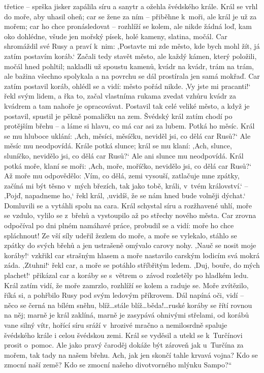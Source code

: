 třetice -- sprška jisker zapálila síru a sanytr a ožehla švédského krále. Král se vrhl do moře, aby uhasil oheň; car se žene za ním -- přiběhne k moři, ale král je už za mořem; car ho chce pronásledovat -- rozhlíží se kolem, ale nikde žádná loď, kam oko dohlédne, všude jen mořský písek, holé kameny, slatina, močál. Car shromáždil své Rusy a praví k nim: ‚Postavte mi zde město, kde bych mohl žít, já zatím postavím koráb.‘ Začali tedy stavět město, ale každý kámen, který položili, močál hned pohltil; nakladli už spoustu kamenů, kvádr na kvádr, trám na trám, ale bažina všechno spolykala a na povrchu se dál prostírala jen samá mokřaď. Car zatím postavil koráb, ohlédl se a vidí: město pořád nikde. ‚Vy jste mi pracanti!‘ řekl svým lidem, a řka to, začal vlastníma rukama zvedat vzhůru kvádr za kvádrem a tam nahoře je opracovávat. Postavil tak celé veliké město, a když je postavil, spustil je pěkně pomaličku na zem. Švédský král zatím chodí po protějším břehu -- a láme si hlavu, co má car asi za lubem. Potká ho měsíc. Král se mu hluboce uklání: ‚Ach, měsíci, měsíčku, neviděl jsi, co dělá car Rusů?‘ Ale měsíc mu neodpovídá. Krále potká slunce; král se mu klaní: ‚Ach, slunce, sluníčko, nevidělo jsi, co dělá car Rusů?‘ Ale ani slunce mu neodpovídá. Král potká moře, klaní se moři: ‚Ach, moře, moříčko, nevidělo jsi, co dělá car Rusů?‘ Až moře mu odpovědělo: ‚Vím, co dělá, zemi vysouší, zatlačuje mne zpátky, začíná mi být těsno v mých březích, tak jako tobě, králi, v tvém království.‘ -- ‚Pojď, napadneme ho,‘ řekl král, ‚uvidíš, že se nám hned bude volněji dýchat.‘ Domluvili se a vytáhli spolu na cara. Král schystal síru a rozžhavené uhlí, moře se vzdulo, vylilo se z břehů a vystoupilo až po střechy nového města. Car zrovna odpočíval po dni plném namáhavé práce, probudil se a vidí: moře ho chce spláchnout! Ze vší síly udeřil žezlem do moře, a moře se vylekalo, stáhlo se zpátky do svých břehů a jen ustrašeně omývalo carovy nohy. ‚Nauč se nosit moje koráby!‘ vzkřikl car strašným hlasem a moře nastavilo carským lodicím svá mokrá záda. ‚Ztuhni!‘ řekl car, a moře se potáhlo stříbřitým ledem. ‚Duj, bouře, do mých plachet!‘ přikázal car a koráby se s větrem o~závod rozletěly po hladkém ledu. Král zatím vidí, že moře zamrzlo, rozhlíží se kolem a raduje se. Moře zvítězilo, říká si, a pohřbilo Rusy pod svým ledovým příkrovem. Dál napíná oči, vidí -- něco se černá na bílém sněhu, blíž\ldots stále blíž\ldots běda!\ldots ruské koráby se řítí rovnou na něj; marně je král zaklíná, marně je zasypává ohnivými střelami, od korábů vane silný vítr, hořící síru sráží v hrozivé mračno a nemilosrdně spaluje švédského krále i celou švédskou zemi. Král se vyděsil a utekl se k Turčínovi prosit o~pomoc. Ale jako pravý čaroděj dokáže být zároveň jak u~Turčína za mořem, tak tady na našem břehu. Ach, jak jen skončí tahle krvavá vojna? Kdo se zmocní naší země? Kdo se zmocní našeho divotvorného mlýnku Sampo?``

